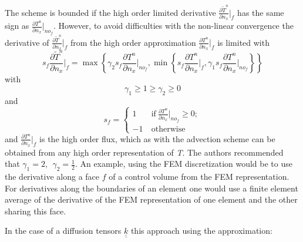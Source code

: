 The scheme is bounded if the high order limited derivative $\frac{\partial \widetilde{T}^{n}}{\partial n_x}\vert_{f}$ has the same sign as $\frac{\partial T^{n}}{\partial n_x}\vert_{no_f}$. However, to avoid difficulties with the non-linear convergence the derivative of $\frac{\partial \widetilde{T}^{n}}{\partial n_x}\vert_{f}$ from the high order approximation $\frac{\partial T^{n}}{\partial n_x}\vert_{f}$ is limited with
\begin{displaymath}
s_f \frac{\partial \widetilde{T}^{n}}{\partial n_x}\Big\vert_f
= \max \left\{ \gamma_2 s_f \frac{\partial T^{n}}{\partial n_x}\Big\vert_{no_f},
\min \left\{ s_f \frac{\partial T^{n}}{\partial n_x}\Big\vert_{f},
\gamma_{1} s_{f} \frac{\partial T^{n}}{\partial n_x}\Big\vert_{no_f} \right\}
\right\}
\end{displaymath}
with
\begin{displaymath}
\gamma_1 \geq 1 \geq \gamma_2 \geq 0
\end{displaymath}
and
\begin{displaymath}
s_f =
  \begin{cases}
     1 & \ \text{if} \ \frac{\partial T^n}{\partial n_x}\vert_{no_f} \geq 0; \\
    -1 & \ \text{otherwise} \
\end{cases}
\end{displaymath}
and $\frac{\partial T^{n}}{\partial n_x}\vert_{f}$ is the high order flux, which as with the advection scheme can be obtained from any high order representation of \textit{T}. The authors recommended that  $\gamma_{1} = 2, \ \ \gamma_2 = \frac{1}{2}$.  An example, using the FEM discretization would be to use the derivative along a face $f$ of a control volume from the FEM representation. For derivatives along the boundaries of an element one would use a finite element average of the derivative of the FEM representation of one element and the other sharing this face.

In the case of a diffusion tensors ${\underline{\underline k}}$ this approach using the approximation:

